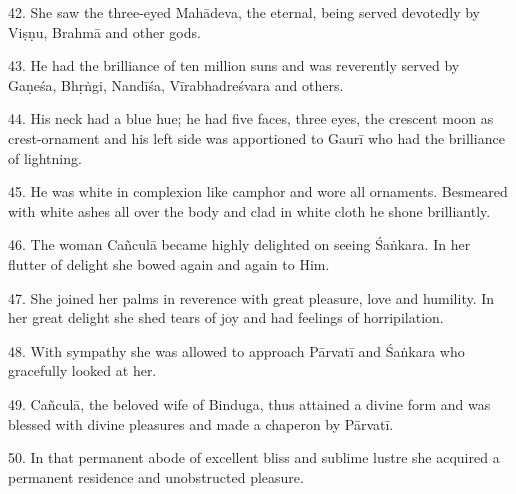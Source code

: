 42. She saw the three-eyed Mahādeva, the eternal, being served devotedly by
Viṣṇu, Brahmā and other gods.

43. He had the brilliance of ten million suns and was reverently served by
Gaṇeśa, Bhṛṅgi, Nandīśa, Vīrabhadreśvara and others.

44. His neck had a blue hue; he had five faces, three eyes, the crescent moon as
crest-ornament and his left side was apportioned to Gaurī who had the brilliance
of lightning.

45. He was white in complexion like camphor and wore all ornaments. Besmeared
with white ashes all over the body and clad in white cloth he shone brilliantly.

46. The woman Cañculā became highly delighted on seeing Śaṅkara. In her flutter
of delight she bowed again and again to Him.

47. She joined her palms in reverence with great pleasure, love and humility. In
her great delight she shed tears of joy and had feelings of horripilation.

48. With sympathy she was allowed to approach Pārvatī and Śaṅkara who gracefully
looked at her.

49. Cañculā, the beloved wife of Binduga, thus attained a divine form and was
blessed with divine pleasures and made a chaperon by Pārvatī.

50. In that permanent abode of excellent bliss and sublime lustre she acquired
a permanent residence and unobstructed pleasure.
